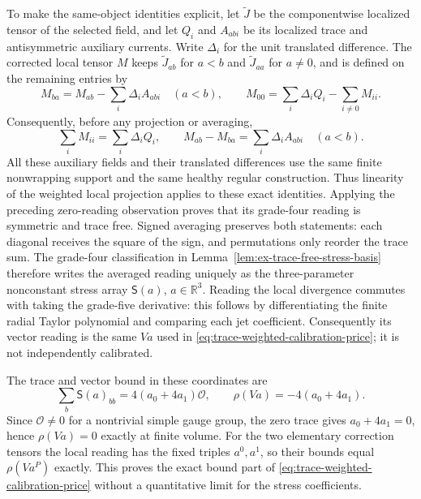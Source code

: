 To make the same-object identities explicit, let $\widetilde J$ be
the componentwise localized tensor of the selected field, and let $Q_i$
and $A_{abi}$ be its localized trace and antisymmetric auxiliary
currents. Write $\Delta_i$ for the unit translated difference. The
corrected local tensor $M$ keeps $\widetilde J_{ab}$ for $a<b$ and
$\widetilde J_{aa}$ for $a\ne0$, and is defined on the remaining entries by
\[
 M_{ba}=M_{ab}-\sum_i\Delta_i A_{abi}\quad(a<b),\qquad
 M_{00}=\sum_i\Delta_iQ_i-\sum_{i\ne0}M_{ii}.
\]
Consequently, before any projection or averaging,
\[
 \sum_iM_{ii}=\sum_i\Delta_i Q_i,\qquad
 M_{ab}-M_{ba}=\sum_i\Delta_i A_{abi}\quad(a<b).
\]
All these auxiliary fields and their translated differences use the same
finite nonwrapping support and the same healthy regular construction.
Thus linearity of the weighted local projection applies to these exact
identities. Applying the preceding zero-reading observation proves that
its grade-four reading is symmetric and trace free. Signed averaging
preserves both statements: each diagonal receives the square of the sign,
and permutations only reorder the trace sum. The grade-four classification
in Lemma~\ref{lem:ex-trace-free-stress-basis} therefore writes the averaged
reading uniquely as the three-parameter nonconstant stress array
$\mathsf S(a)$, $a\in\mathbb R^3$. Reading the local divergence commutes
with taking the grade-five derivative: this follows by differentiating the
finite radial Taylor polynomial and comparing each jet coefficient.
Consequently its vector reading is the same $Va$ used in
\eqref{eq:trace-weighted-calibration-price}; it is not independently
calibrated.

The trace and vector bound in these coordinates are
\[
 \sum_b\mathsf S(a)_{bb}=4(a_0+4a_1)\mathcal O,\qquad
 \rho(Va)=-4(a_0+4a_1).
\]
Since $\mathcal O\ne0$ for a nontrivial simple gauge group, the zero
trace gives $a_0+4a_1=0$, hence $\rho(Va)=0$ exactly at finite volume.
For the two elementary correction tensors the local reading has the
fixed triples $a^0,a^1$, so their bounds equal $\rho(Va^P)$ exactly.
This proves the exact bound part of
\eqref{eq:trace-weighted-calibration-price} without a quantitative limit
for the stress coefficients.

